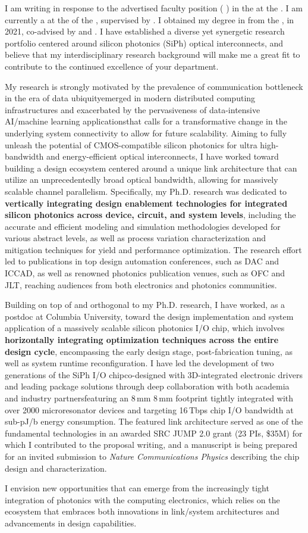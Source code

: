 I am writing in response to the advertised faculty position (\textbf{\appPosition{} \appJobID}) in the \appDept{} at the \appSchool{}. I am currently a \myTitle{} at the \myDept{} of the \mySchoolShort{}, supervised by \mySuper{}. I obtained my \myDegree{} degree in \myMajor{} from the \myPhDSchool{}, in 2021, co-advised by \myAdvisor{} and \myCoAdvisor{}. I have established a diverse yet synergetic research portfolio centered around silicon photonics (SiPh) optical interconnects, and believe that my interdisciplinary research background will make me a great fit to contribute to the continued excellence of your department.

My research is strongly motivated by the prevalence of communication bottleneck in the era of data ubiquity\textemdash emerged in modern distributed computing infrastructures and exacerbated by the pervasiveness of data-intensive AI/machine learning applications\textemdash that calls for a transformative change in the underlying system connectivity to allow for future scalability. Aiming to fully unleash the potential of CMOS-compatible silicon photonics for ultra high-bandwidth and energy-efficient optical interconnects, I have worked toward building a design ecosystem centered around a unique link architecture that can utilize an unprecedentedly broad optical bandwidth, allowing for massively scalable channel parallelism. Specifically, my Ph.D. research was dedicated to \textbf{vertically integrating design enablement technologies for integrated silicon photonics across device, circuit, and system levels}, including the accurate and efficient modeling and simulation methodologies developed for various abstract levels, as well as process variation characterization and mitigation techniques for yield and performance optimization. The research effort led to publications in top design automation conferences, such as DAC and ICCAD, as well as renowned photonics publication venues, such as OFC and JLT, reaching audiences from both electronics and photonics communities.

Building on top of and orthogonal to my Ph.D. research, I have worked, as a postdoc at Columbia University, toward the design implementation and system application of a massively scalable silicon photonics I/O chip, which involves \textbf{horizontally integrating optimization techniques across the entire design cycle}, encompassing the early design stage, post-fabrication tuning, as well as system runtime reconfiguration. I have led the development of two generations of the SiPh I/O chip\textemdash co-designed with 3D-integrated electronic drivers and leading package solutions through deep collaboration with both academia and industry partners\textemdash featuring an 8\,mm \texttimes{} 8\,mm footprint tightly integrated with over 2000 microresonator devices and targeting 16\,Tbps chip I/O bandwidth at sub-pJ/b energy consumption. The featured link architecture served as one of the fundamental technologies in an awarded SRC JUMP 2.0 grant (23 PIs, \$35M) for which I contributed to the proposal writing, and a manuscript is being prepared for an invited submission to \emph{Nature Communications Physics} describing the chip design and characterization.

I envision new opportunities that can emerge from the increasingly tight integration of photonics with the computing electronics, which relies on the ecosystem that embraces both innovations in link/system architectures and advancements in design capabilities.




